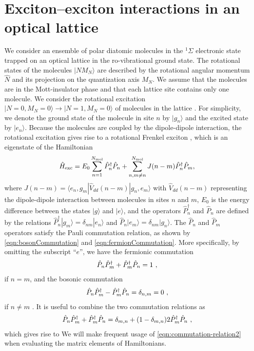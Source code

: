 \section{Exciton--exciton interactions in an optical lattice}
We consider an ensemble of polar diatomic molecules in the $^1\Sigma$ electronic state trapped on an optical lattice 
in the ro-vibrational ground state. The rotational states of the molecules $|NM_N\rangle$ are described by the
 rotational angular momentum $\hat{N}$ and its projection on the quantization axis $M_{N}$. We assume that the
 molecules are in the Mott-insulator phase \cite{umol, umol2, umol3} and that each lattice site contains only one
 molecule.  We consider the rotational excitation $|N=0, M_N = 0 \rangle \rightarrow |N = 1, M_N = 0 \rangle$ of
 molecules in the lattice \cite{note}. For simplicity, we denote the ground state of the molecule in site $n$ by 
$|g_{n}\rangle$ and the excited state by $|e_{n}\rangle$.  Because the molecules are coupled by the dipole-dipole
 interaction, the rotational excitation gives rise to a rotational Frenkel exciton \cite{felipe}, which is an eigenstate of
 the Hamiltonian 
\begin{equation}
\hat{H}_{\rm exc} = E_0 \sum\limits_{n=1}^{N_{\rm mol}} \hat{P}_n^\dag
\hat{P}_n +  \sum\limits_{n,m \neq n}^{N_{\rm mol}}
J(n-m)\hat{P}_n^\dag \hat{P}_m,
\label{exciton}
\end{equation}
where $J(n-m) = \langle e_{n} , g_{m} | \hat{V}_{dd}(n-m) | g_{n}, e_{m} \rangle$ with $\hat{V}_{dd}(n-m)$ representing
 the dipole-dipole interaction between molecules in sites $n$ and $m$, $E_0$ is the energy difference between the states
 $|g\rangle$ and $|e\rangle$, and the operators $\hat{P}_n^\dag$ and $\hat{P}_n$ are defined by the relations 
$\hat{P}_n^\dag | g_{m} \rangle = \delta_{nm} | e_{n}
\rangle$ and $\hat{P}_n | e_{m} \rangle = \delta_{nm} | g_{n} \rangle$.
The $\hat{P}_n$ and $\hat{P}_m$ operators satisfy the Pauli commutation relation, as shown by \autoref{eqn:bosonCommutation} and \autoref{eqn:fermionCommutation}. More specifically, by omitting the subscript ``$e$'', we have the fermionic commutation
\begin{equation}
\hat{P}_{n}\hat{P}^{\dagger}_{m} + \hat{P}^{\dagger}_{m}\hat{P}_{n} = 1 \  ,
\end{equation}
 if $n = m$, and the bosonic commutation
\begin{equation}
\hat{P}_{n}\hat{P}^{\dagger}_{m} - \hat{P}^{\dagger}_{m}\hat{P}_{n} = \delta_{n,m} = 0 \  ,
\end{equation}
 if $n \neq m$ \cite{agranovich}.
 It is useful to combine the two commutation relations as 
\begin{equation}
\p{n}\pd{m} + \pd{m}\p{n} = \delta_{m,n} + (1-\delta_{m,n})2\pd{m}\p{n} \ ,  \label{eqn:commutation-relation}
\end{equation}
which gives rise to 
We will make frequent usage of \autoref{eqn:commutation-relation2} when evaluating the matrix elements of Hamiltonians. 


